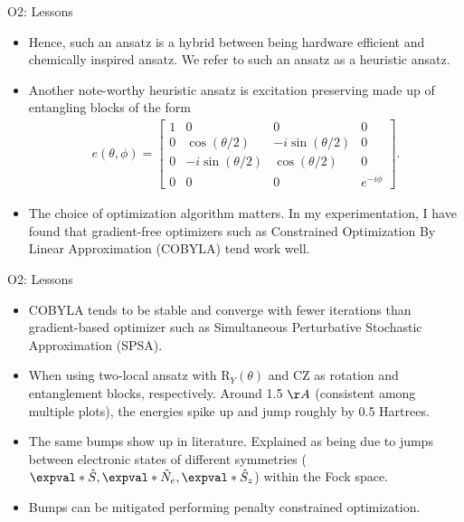 \begin{frame}{O2: Lessons}
  \begin{itemize}
    \setlength\itemsep{0.1em}
    \item Hence, such an ansatz is a hybrid between being hardware efficient and chemically inspired ansatz.  We refer to such an ansatz as a heuristic ansatz.

    \item Another note-worthy heuristic ansatz is excitation preserving made up of entangling blocks of the form
      \begin{align*}
        e(\theta, \phi) =
          \begin{bmatrix}
            1 & 0                  &  0                  & 0 \\
            0 & \cos{(\theta/2)}   & -i\sin{(\theta/2)}  & 0 \\
            0 & -i\sin{(\theta/2)} &  \cos{(\theta/2)}   & 0 \\
            0 & 0                  &  0                  & e^{-i\phi}
          \end{bmatrix}.
      \end{align*}

    \item The choice of optimization algorithm matters. In my experimentation, I have found that gradient-free optimizers
          such as Constrained Optimization By Linear Approximation (COBYLA) tend work well.

  \end{itemize}
\end{frame}

\begin{frame}{O2: Lessons}
  \begin{itemize}
    \setlength\itemsep{0.1em}
    \item COBYLA tends to be stable and converge with fewer iterations than gradient-based optimizer
          such as Simultaneous Perturbative Stochastic Approximation (SPSA).

    \item When using two-local ansatz with $\text{R}_{Y}(\theta)$ and CZ as rotation and entanglement blocks, respectively.
          Around 1.5 $\AA$ (consistent among multiple plots), the energies spike up and jump roughly by 0.5 Hartrees.

    \item The same bumps show up in literature. Explained as being due to jumps between electronic states of different symmetries ($\expval*{\hat{S}}, \expval*{\hat{N}_e}, \expval*{\hat{S}_z}$) within the Fock space.

    \item Bumps can be mitigated performing penalty constrained optimization.

  \end{itemize}
\end{frame}

